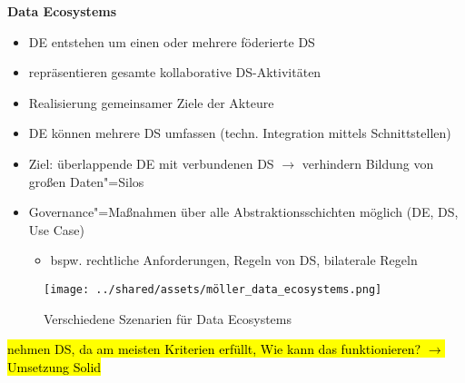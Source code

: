\textbf{Data Ecosystems}
\begin{itemize}
    \item DE entstehen um einen oder mehrere föderierte DS
    \item repräsentieren gesamte kollaborative DS-Aktivitäten
    \item Realisierung gemeinsamer Ziele der Akteure
    \item DE können mehrere DS umfassen (techn. Integration mittels Schnittstellen)
    \item Ziel: überlappende DE mit verbundenen DS $\to$ verhindern Bildung von großen Daten"=Silos
    \item Governance"=Maßnahmen über alle Abstraktionsschichten möglich (DE, DS, Use Case)
    \begin{itemize}
        \item bspw. rechtliche Anforderungen, Regeln von DS, bilaterale Regeln
    \end{itemize}
\end{itemize}

\begin{figure}
    \texttt{[image: ../shared/assets/möller\_data\_ecosystems.png]}
    \caption{Verschiedene Szenarien für Data Ecosystems~\cite{mollerIndustrialDataEcosystems2024}}
\end{figure}

\vspace{1cm}

\hl{nehmen DS, da am meisten Kriterien erfüllt, Wie kann das funktionieren? $\to$ Umsetzung Solid}
